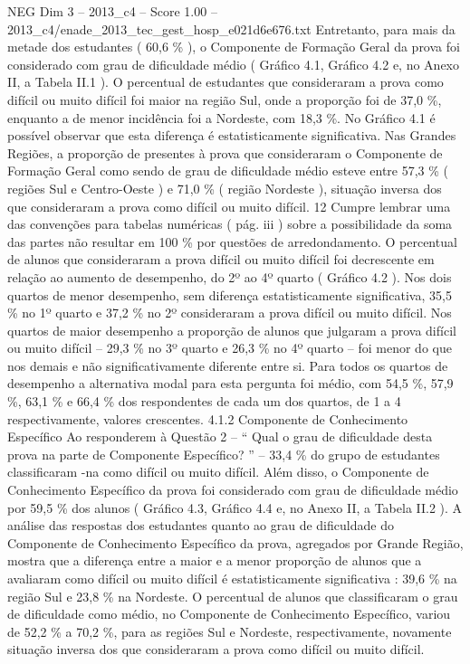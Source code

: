 \begin{textsample}{NEG Dim 3 – 2013\_c4 – Score 1.00 – 2013\_c4/enade\_2013\_tec\_gest\_hosp\_e021d6e676.txt}
Entretanto, para mais da metade dos estudantes ( 60,6 \% ), o Componente de Formação Geral da prova foi considerado com grau de dificuldade médio ( Gráfico 4.1, Gráfico 4.2 e, no Anexo II, a Tabela II.1 ).
O percentual de estudantes que consideraram a prova como difícil ou muito difícil foi maior na região Sul, onde a proporção foi de 37,0 \%, enquanto a de menor incidência foi a Nordeste, com 18,3 \%.
No Gráfico 4.1 é possível observar que esta diferença é estatisticamente significativa.
Nas Grandes Regiões, a proporção de presentes à prova que consideraram o Componente de Formação Geral como sendo de grau de dificuldade médio esteve entre 57,3 \% ( regiões Sul e Centro-Oeste ) e 71,0 \% ( região Nordeste ), situação inversa dos que consideraram a prova como difícil ou muito difícil. 12 Cumpre lembrar uma das convenções para tabelas numéricas ( pág. iii ) sobre a possibilidade da soma das partes não resultar em 100 \% por questões de arredondamento.
O percentual de alunos que consideraram a prova difícil ou muito difícil foi decrescente em relação ao aumento de desempenho, do 2º ao 4º quarto ( Gráfico 4.2 ).
Nos dois quartos de menor desempenho, sem diferença estatisticamente significativa, 35,5 \% no 1º quarto e 37,2 \% no 2º consideraram a prova difícil ou muito difícil.
Nos quartos de maior desempenho a proporção de alunos que julgaram a prova difícil ou muito difícil – 29,3 \% no 3º quarto e 26,3 \% no 4º quarto – foi menor do que nos demais e não significativamente diferente entre si.
Para todos os quartos de desempenho a alternativa modal para esta pergunta foi médio, com 54,5 \%, 57,9 \%, 63,1 \% e 66,4 \% dos respondentes de cada um dos quartos, de 1 a 4 respectivamente, valores crescentes. 4.1.2 Componente de Conhecimento Específico Ao responderem à Questão 2 – “ Qual o grau de dificuldade desta prova na parte de Componente Específico? ” – 33,4 \% do grupo de estudantes classificaram -na como difícil ou muito difícil.
Além disso, o Componente de Conhecimento Específico da prova foi considerado com grau de dificuldade médio por 59,5 \% dos alunos ( Gráfico 4.3, Gráfico 4.4 e, no Anexo II, a Tabela II.2 ).
A análise das respostas dos estudantes quanto ao grau de dificuldade do Componente de Conhecimento Específico da prova, agregados por Grande Região, mostra que a diferença entre a maior e a menor proporção de alunos que a avaliaram como difícil ou muito difícil é estatisticamente significativa : 39,6 \% na região Sul e 23,8 \% na Nordeste.
O percentual de alunos que classificaram o grau de dificuldade como médio, no Componente de Conhecimento Específico, variou de 52,2 \% a 70,2 \%, para as regiões Sul e Nordeste, respectivamente, novamente situação inversa dos que consideraram a prova como difícil ou muito difícil.

\end{textsample}
